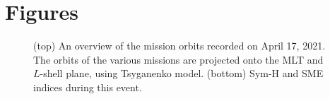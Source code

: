 \documentclass[
  letterpaper,
  DIV=11,
  numbers=noendperiod]{scrartcl}
\begin{document}
\section{Figures}\label{figures}

\begin{figure}


\caption{\label{fig-1}(top) An overview of the mission orbits recorded on April 17, 2021. The orbits of the various missions are projected onto the MLT and \(L\)-shell plane, using Tsyganenko model. (bottom) Sym-H and SME indices during this event.}

\end{figure}%
\end{document}
